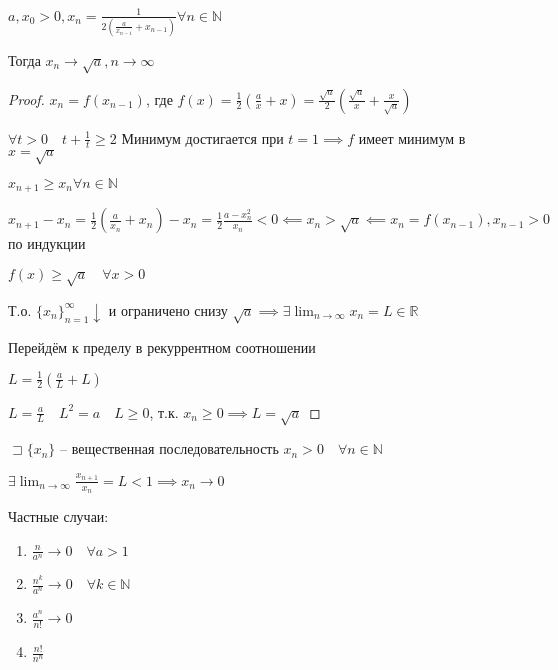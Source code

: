 \documentclass{book}
\newcommand\N{\ensuremath{\mathbb{N}}}
\newcommand\R{\ensuremath{\mathbb{R}}}
\theoremstyle{definition}
\begin{document}
\begin{statement}

    $a, x_0>0, x_{n} = \frac{1}{2\left( \frac{a}{x_{n-1}} + x_{n-1} \right) } \forall n\in \N $

    Тогда $x_n\to \sqrt{a}, n\to \infty  $
\end{statement}
\begin{proof}
    $x_{n}  = f(x_{n-1})$, где $f(x) = \frac{1}{2}\left( \frac{a}{x}+x \right)  = \frac{\sqrt{a} }{2}\left( \frac{\sqrt{a} }{x} + \frac{x}{\sqrt{a} } \right) $ 

    $\forall t>0\quad t + \frac{1}{t}\geqslant 2$ Минимум достигается при $t=1 \implies f$ имеет минимум в $x = \sqrt{a} $ 

    $x_{n+1}\geqslant x_n\forall n\in \N $

    $x_{n+1} - x_n = \frac{1}{2}\left( \frac{a}{x_n} + x_n \right) -x_n = \frac{1}{2}\frac{a-x_n^2}{x_n}<0 \impliedby x_n>\sqrt{a} \impliedby x_n = f(x_{n-1}), x_{n-1}>0 $ по индукции

    $f(x)\geqslant \sqrt{a}\quad \forall x>0 $

    Т.о. $\{x_{n} \}_{n=1}^{\infty }\downarrow$ и ограничено снизу $\sqrt{a}  \implies \exists \lim_{n \to \infty} x_{n}  = L\in \R$

    Перейдём к пределу в рекуррентном соотношении

    $L = \frac{1}{2}\left( \frac{a}{L} + L \right) $ 

    $L = \frac{a}{L}\quad L^2=a\quad L\geqslant 0$, т.к. $x_{n} \geqslant 0 \implies L = \sqrt{a} $
\end{proof}

\begin{statement}
    $\sqsupset \{x_{n} \}$ -- вещественная последовательность $x_{n} >0\quad \forall n\in \N $ 

    $\exists \lim_{n \to \infty} \frac{x_{n+1} }{x_{n} } = L<1 \implies x_{n} \to 0$
\end{statement}

Частные случаи:
\begin{enumerate}
    \item $\frac{n}{a^n}\to 0\quad \forall a>1$ 
    \item $\frac{n^k}{a^n}\to 0\quad \forall  k\in \N $ 
    \item $\frac{a^n}{n!} \to 0$ 
    \item $\frac{n!}{n^n}$
\end{enumerate}
\end{document}
